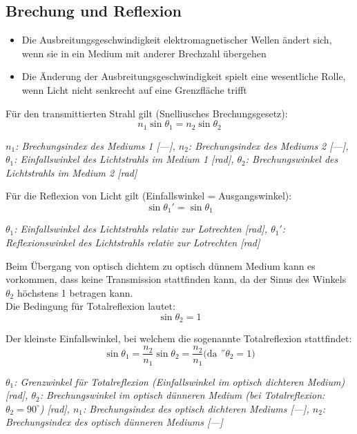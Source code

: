 \documentclass[a4paper,10pt]{article}
\newenvironment{displayformula}
{
	\begin{framed}
		\color{formulaColor}
	}
	{\end{framed}}
\newcommand{\formulalegend}[1]{%
	\par\vspace{0.5ex}%
	{{\color{legendColor}\RaggedRight\small\textit{#1}}}%
	\par\vspace{1.5ex}%
}
\begin{document}
\newpage

\subsection{Brechung und Reflexion}

\begin{displayformula}
	\begin{itemize}
		\item Die Ausbreitungsgeschwindigkeit elektromagnetischer Wellen ändert sich, wenn sie in ein Medium mit anderer Brechzahl übergehen
		\item Die Änderung der Ausbreitungsgeschwindigkeit spielt eine wesentliche Rolle, wenn Licht nicht senkrecht auf eine Grenzfläche trifft
	\end{itemize}
\end{displayformula}

\begin{displayformula}
	Für den transmittierten Strahl gilt (Snelliusches Brechungsgesetz):
	\[
	n_1 \sin \theta_1 = n_2 \sin \theta_2
	\]
\end{displayformula}
\formulalegend{
	\( n_1 \): Brechungsindex des Mediums 1 [—], 
	\( n_2 \): Brechungsindex des Mediums 2 [—], 
	\( \theta_1 \): Einfallswinkel des Lichtstrahls im Medium 1 [rad], 
	\( \theta_2 \): Brechungswinkel des Lichtstrahls im Medium 2 [rad]
}


\begin{displayformula}
	Für die Reflexion von Licht gilt (Einfallswinkel = Ausgangswinkel):
	\[
	\sin \theta_1' = \sin \theta_1
	\]
\end{displayformula}
\formulalegend{
	\( \theta_1 \): Einfallswinkel des Lichtstrahls relativ zur Lotrechten [rad], 
	\( \theta_1' \): Reflexionswinkel des Lichtstrahls relativ zur Lotrechten [rad]
}


\begin{displayformula}
	Beim Übergang von optisch dichtem zu optisch dünnem Medium kann es vorkommen, dass keine Transmission stattfinden kann, da der Sinus des Winkels $\theta_2$ höchstens 1 betragen kann. \\
	Die Bedingung für Totalreflexion lautet:
	\[
	\sin \theta_2 = 1
	\]
	
	Der kleinste Einfallswinkel, bei welchem die sogenannte Totalreflexion stattfindet:
	\[
	\sin \theta_1 = \frac{n_2}{n_1} \sin \theta_2 = \frac{n_2}{n_1} \text{(da $˝\theta_2 = 1$)}
	\]
\end{displayformula}
\formulalegend{
	\( \theta_1 \): Grenzwinkel für Totalreflexion (Einfallswinkel im optisch dichteren Medium) [rad], 
	\( \theta_2 \): Brechungswinkel im optisch dünneren Medium (bei Totalreflexion: \( \theta_2 = 90^\circ \)) [rad], 
	\( n_1 \): Brechungsindex des optisch dichteren Mediums [—], 
	\( n_2 \): Brechungsindex des optisch dünneren Mediums [—]
}
\end{document}
